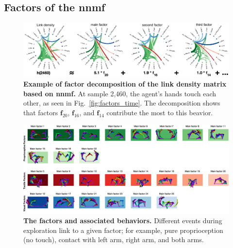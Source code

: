 \documentclass[letterpaper, 10 pt, conference]{ieeeconf}  %
\begin{document}
\subsection{Factors of the \ac{nnmf}}
\begin{figure}[h!]
    \centering
    \includegraphics[width=1\linewidth]{fig/factors_decomposition.png}
    \caption{\textbf{Example of factor decomposition of the link density matrix based on \ac{nnmf}.} At sample 2,460, the agent's hands touch each other, as seen in Fig.~\ref{fig:factors_time}. The decomposition shows that factors $\bm{f}_{20}$, $\bm{f}_{16}$, and $\bm{f}_{14}$ contribute the most to this beavior.}
    \label{fig:decomposition}
\end{figure}
\begin{figure}[!t]
	\begin{center}
		\hspace*{\fill}
        \includegraphics[width=1\textwidth]{fig/mainfactors_represente.png}
		\hspace*{\fill}
	\end{center}
    \vspace{-25pt}
	\caption{\textbf{The factors and associated behaviors.} Different events during exploration link to a given factor; for example, pure proprioception (no touch), contact with left arm, right arm, and both arms.}
    \label{fig:main_factors}
\end{figure}
 
\end{document}
